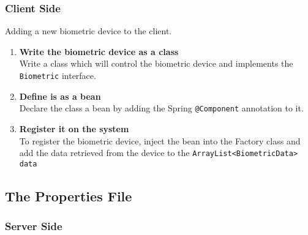 \subsubsection{Client Side}
Adding a new biometric device to the client.
\begin{enumerate}
	\item \textbf{Write the biometric device as a class}
	\\Write a class which will control the biometric device and implements the \verb|Biometric| interface.
	\item \textbf{Define is as a bean}
	\\Declare the class a bean by adding the Spring  \verb!@Component! annotation to it.
	\item \textbf{Register it on the system} 
	\\To register the biometric device, inject the bean into the Factory class and add the data retrieved from the device to the \verb|ArrayList<BiometricData> data|
\end{enumerate}

\subsection{The Properties File}
\subsubsection{Server Side}

